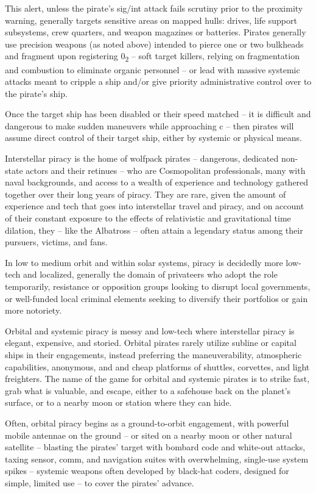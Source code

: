 This alert, unless the pirate’s sig/int attack fails scrutiny prior to the proximity warning, generally
targets sensitive areas on mapped hulls: drives, life support subsystems, crew quarters, and
weapon magazines or batteries. Pirates generally use precision weapons (as noted above)
intended to pierce one or two bulkheads and fragment upon registering 0\textsubscript{2}  -- soft target killers,
relying on fragmentation and combustion to eliminate organic personnel -- or lead with massive
systemic attacks meant to cripple a ship and/or give priority administrative control over to the
pirate’s ship.

Once the target ship has been disabled or their speed matched -- it is difficult and dangerous to
make sudden maneuvers while approaching c -- then pirates will assume direct control of their
target ship, either by systemic or physical means.

Interstellar piracy is the home of wolfpack pirates -- dangerous, dedicated non-state actors and
their retinues -- who are Cosmopolitan professionals, many with naval backgrounds, and access
to a wealth of experience and technology gathered together over their long years of piracy. They
are rare, given the amount of experience and tech that goes into interstellar travel and piracy, and
on account of their constant exposure to the effects of relativistic and gravitational time dilation,
they  -- like the Albatross -- often attain a legendary status among their pursuers, victims, and
fans.

In low to medium orbit and within solar systems, piracy is decidedly more low-tech and localized,
generally the domain of privateers who adopt the role temporarily, resistance or opposition groups
looking to disrupt local governments, or well-funded local criminal elements seeking to diversify
their portfolios or gain more notoriety.

Orbital and systemic piracy is messy and low-tech where interstellar piracy is elegant, expensive,
and storied. Orbital pirates rarely utilize subline or capital ships in their engagements, instead
preferring the maneuverability, atmospheric capabilities, anonymous, and and cheap platforms of
shuttles, corvettes, and light freighters. The name of the game for orbital and systemic pirates is
to strike fast, grab what is valuable, and escape, either to a safehouse back on the planet’s
surface, or to a nearby moon or station where they can hide.

Often, orbital piracy begins as a ground-to-orbit engagement, with powerful mobile antennae on
the ground -- or sited on a nearby moon or other natural satellite -- blasting the pirates’ target with
bombard code and white-out attacks, taxing sensor, comm, and navigation suites with
overwhelming, single-use system spikes -- systemic weapons often developed by black-hat
coders, designed for simple, limited use -- to cover the pirates’ advance.

